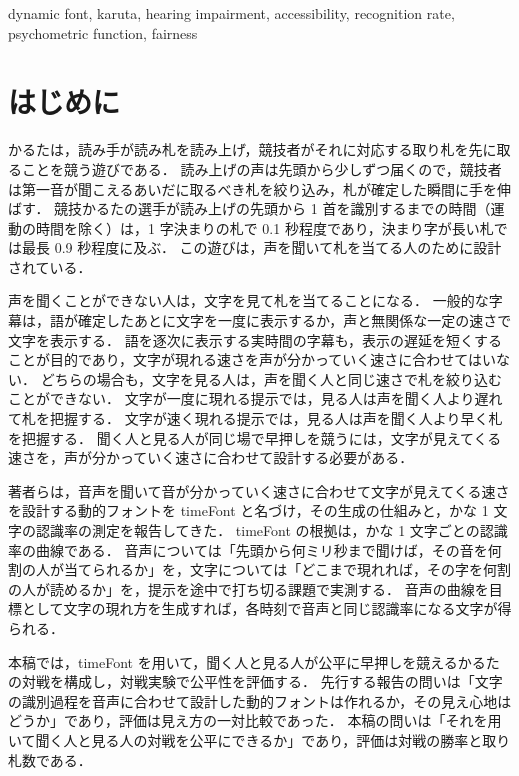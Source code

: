 \begin{ekeyword}
dynamic font, karuta, hearing impairment, accessibility, recognition rate, psychometric function, fairness
\end{ekeyword}

\maketitle

\section{はじめに}

かるたは，読み手が読み札を読み上げ，競技者がそれに対応する取り札を先に取ることを競う遊びである．
読み上げの声は先頭から少しずつ届くので，競技者は第一音が聞こえるあいだに取るべき札を絞り込み，札が確定した瞬間に手を伸ばす．
競技かるたの選手が読み上げの先頭から 1 首を識別するまでの時間（運動の時間を除く）は，1 字決まりの札で 0.1 秒程度であり，決まり字が長い札では最長 0.9 秒程度に及ぶ\cite{maruyama2026ec}．
この遊びは，声を聞いて札を当てる人のために設計されている．

声を聞くことができない人は，文字を見て札を当てることになる．
一般的な字幕は，語が確定したあとに文字を一度に表示するか，声と無関係な一定の速さで文字を表示する．
語を逐次に表示する実時間の字幕\cite{kazemi2014}も，表示の遅延を短くすることが目的であり，文字が現れる速さを声が分かっていく速さに合わせてはいない．
どちらの場合も，文字を見る人は，声を聞く人と同じ速さで札を絞り込むことができない．
文字が一度に現れる提示では，見る人は声を聞く人より遅れて札を把握する．
文字が速く現れる提示では，見る人は声を聞く人より早く札を把握する．
聞く人と見る人が同じ場で早押しを競うには，文字が見えてくる速さを，声が分かっていく速さに合わせて設計する必要がある．

著者らは，音声を聞いて音が分かっていく速さに合わせて文字が見えてくる速さを設計する動的フォントを timeFont と名づけ，その生成の仕組みと，かな 1 文字の認識率の測定を報告してきた\cite{maruyama2026wiss}．
timeFont の根拠は，かな 1 文字ごとの認識率の曲線である．
音声については「先頭から何ミリ秒まで聞けば，その音を何割の人が当てられるか」を，文字については「どこまで現れれば，その字を何割の人が読めるか」を，提示を途中で打ち切る課題で実測する．
音声の曲線を目標として文字の現れ方を生成すれば，各時刻で音声と同じ認識率になる文字が得られる．

本稿では，timeFont を用いて，聞く人と見る人が公平に早押しを競えるかるたの対戦を構成し，対戦実験で公平性を評価する．
先行する報告\cite{maruyama2026wiss}の問いは「文字の識別過程を音声に合わせて設計した動的フォントは作れるか，その見え心地はどうか」であり，評価は見え方の一対比較であった．
本稿の問いは「それを用いて聞く人と見る人の対戦を公平にできるか」であり，評価は対戦の勝率と取り札数である．

